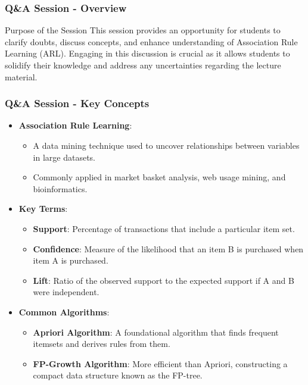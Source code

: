 \documentclass[aspectratio=169]{beamer}
\begin{document}
\begin{frame}[fragile]
    \frametitle{Q\&A Session - Overview}
    \begin{block}{Purpose of the Session}
        This session provides an opportunity for students to clarify doubts, discuss concepts, and enhance understanding of Association Rule Learning (ARL). 
        Engaging in this discussion is crucial as it allows students to solidify their knowledge and address any uncertainties regarding the lecture material.
    \end{block}
\end{frame}

\begin{frame}[fragile]
    \frametitle{Q\&A Session - Key Concepts}
    \begin{itemize}
        \item \textbf{Association Rule Learning}:
            \begin{itemize}
                \item A data mining technique used to uncover relationships between variables in large datasets.
                \item Commonly applied in market basket analysis, web usage mining, and bioinformatics.
            \end{itemize}
        \item \textbf{Key Terms}:
            \begin{itemize}
                \item \textbf{Support}: Percentage of transactions that include a particular item set.
                \item \textbf{Confidence}: Measure of the likelihood that an item B is purchased when item A is purchased.
                \item \textbf{Lift}: Ratio of the observed support to the expected support if A and B were independent.
            \end{itemize}
        \item \textbf{Common Algorithms}:
            \begin{itemize}
                \item \textbf{Apriori Algorithm}: A foundational algorithm that finds frequent itemsets and derives rules from them.
                \item \textbf{FP-Growth Algorithm}: More efficient than Apriori, constructing a compact data structure known as the FP-tree.
            \end{itemize}
    \end{itemize}
\end{frame}
\end{document}
